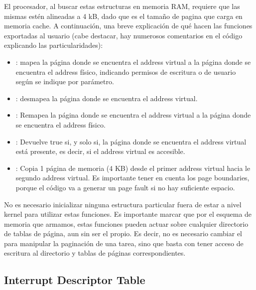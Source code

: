 El procesador, al buscar estas estructuras en memoria RAM, requiere que las mismas estén alineadas a 4 kB, dado que es el tamaño de pagina que carga en memoria cache. A continuación, una breve explicación de qué hacen las funciones exportadas al usuario (cabe destacar, hay numerosos comentarios en el código explicando las particularidades):

\begin{itemize}
\item {}: mapea la página donde se encuentra el address virtual a la página donde se encuentra el address físico, indicando permisos de escritura o de usuario según se indique por parámetro.

\item {}: desmapea la página donde se encuentra el address virtual.

\item {}: Remapea la página donde se encuentra el address virtual a la página donde se encuentra el address físico.

\item {}: Devuelve true si, y solo si, la página donde se encuentra el address virtual está presente, es decir, si el address virtual es accesible.

\item {}: Copia 1 página de memoria (4 KB) desde el primer address virtual hacia le segundo address virtual. Es importante tener en cuenta los page boundaries, porque el código va a generar un page fault si no hay suficiente espacio.
\end{itemize}

No es necesario inicializar ninguna estructura particular fuera de estar a nivel kernel para utilizar estas funciones. Es importante marcar que por el esquema de memoria que armamos, estas funciones pueden actuar sobre cualquier directorio de tablas de página, aun sin ser el propio. Es decir, no es necesario cambiar el  para manipular la paginación de una tarea, sino que basta con tener acceso de escritura al directorio y tablas de páginas correspondientes.

\subsection{Interrupt Descriptor Table}

